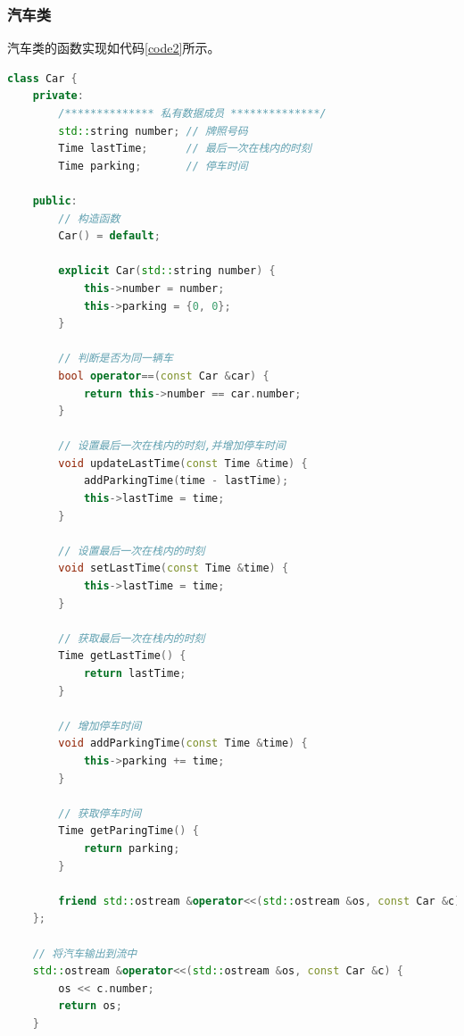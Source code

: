 \documentclass{ctexart}
\begin{document}
    \subsubsection{汽车类}
    汽车类的函数实现如代码\ref{code2}所示。
\begin{lstlisting}[language=C++,caption=Car类的实现,label=code2]
class Car {
    private:
        /************** 私有数据成员 **************/
        std::string number; // 牌照号码
        Time lastTime;      // 最后一次在栈内的时刻
        Time parking;       // 停车时间
    
    public:
        // 构造函数
        Car() = default;
    
        explicit Car(std::string number) {
            this->number = number;
            this->parking = {0, 0};
        }
    
        // 判断是否为同一辆车
        bool operator==(const Car &car) {
            return this->number == car.number;
        }
    
        // 设置最后一次在栈内的时刻,并增加停车时间
        void updateLastTime(const Time &time) {
            addParkingTime(time - lastTime);
            this->lastTime = time;
        }
    
        // 设置最后一次在栈内的时刻
        void setLastTime(const Time &time) {
            this->lastTime = time;
        }
    
        // 获取最后一次在栈内的时刻
        Time getLastTime() {
            return lastTime;
        }
    
        // 增加停车时间
        void addParkingTime(const Time &time) {
            this->parking += time;
        }
    
        // 获取停车时间
        Time getParingTime() {
            return parking;
        }
    
        friend std::ostream &operator<<(std::ostream &os, const Car &c);
    };
    
    // 将汽车输出到流中
    std::ostream &operator<<(std::ostream &os, const Car &c) {
        os << c.number;
        return os;
    }
\end{lstlisting}
\end{document}
